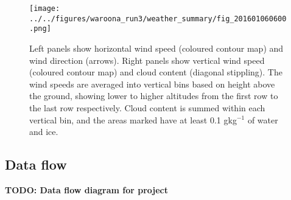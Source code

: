     
    
    \begin{figure}
      \texttt{[image: ../../figures/waroona\_run3/weather\_summary/fig\_201601060600.png]}
      \caption{Left panels show horizontal wind speed (coloured contour map) and wind direction (arrows).
      Right panels show vertical wind speed (coloured contour map) and cloud content (diagonal stippling).
      The wind speeds are averaged into vertical bins based on height above the ground, showing lower to higher altitudes from the first row to the last row respectively.
      Cloud content is summed within each vertical bin, and the areas marked have at least 0.1 gkg$^{-1}$ of water and ice.}
      \label{fig:model:weather_summary_updraught}
    \end{figure}
    
    
  
  \subsection{Data flow}
    \textbf{TODO: Data flow diagram for project}

